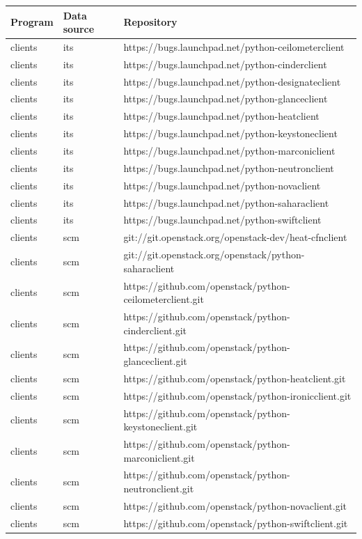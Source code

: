 \documentclass[a4wide,11pt]{report}
\begin{document}
\begin{center}
\begin{longtable}{|p{4cm}|p{1cm}|p{10cm}|} 
\hline
Program & Data source & Repository \\
\hline

clients&its&https://bugs.launchpad.net/python-ceilometerclient\\ 
clients&its&https://bugs.launchpad.net/python-cinderclient\\ 
clients&its&https://bugs.launchpad.net/python-designateclient\\ 
clients&its&https://bugs.launchpad.net/python-glanceclient\\ 
clients&its&https://bugs.launchpad.net/python-heatclient\\ 
clients&its&https://bugs.launchpad.net/python-keystoneclient\\ 
clients&its&https://bugs.launchpad.net/python-marconiclient\\ 
clients&its&https://bugs.launchpad.net/python-neutronclient\\ 
clients&its&https://bugs.launchpad.net/python-novaclient\\ 
clients&its&https://bugs.launchpad.net/python-saharaclient\\ 
clients&its&https://bugs.launchpad.net/python-swiftclient\\ 
clients&scm&git://git.openstack.org/openstack-dev/heat-cfnclient\\ 
clients&scm&git://git.openstack.org/openstack/python-saharaclient\\ 
clients&scm&https://github.com/openstack/python-ceilometerclient.git\\ 
clients&scm&https://github.com/openstack/python-cinderclient.git\\ 
clients&scm&https://github.com/openstack/python-glanceclient.git\\ 
clients&scm&https://github.com/openstack/python-heatclient.git\\ 
clients&scm&https://github.com/openstack/python-ironicclient.git\\ 
clients&scm&https://github.com/openstack/python-keystoneclient.git\\ 
clients&scm&https://github.com/openstack/python-marconiclient.git\\ 
clients&scm&https://github.com/openstack/python-neutronclient.git\\ 
clients&scm&https://github.com/openstack/python-novaclient.git\\ 
clients&scm&https://github.com/openstack/python-swiftclient.git\\ 

\end{longtable}
\end{center}
\end{document}
